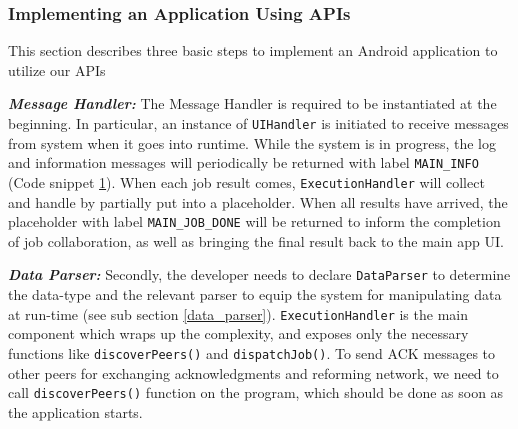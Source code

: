 \documentclass{sig-alternate}[10pt]
\begin{document}
\subsubsection{Implementing an Application Using APIs}
This section describes three basic steps to implement an Android application to utilize our APIs

\textbf{\emph{Message Handler:}}
The Message Handler is required to be instantiated at the beginning. In particular, an instance of \texttt{UIHandler} is initiated to receive messages from system when it goes into runtime. While the system is in progress, the log and information messages will periodically be returned with label \texttt{MAIN\_INFO} (Code snippet \ref{ui_handler}). When each job result comes, \texttt{ExecutionHandler} will collect and handle by partially put into a placeholder. When all results have arrived, the placeholder with label \texttt{MAIN\_JOB\_DONE} will be returned to inform the completion of job collaboration, as well as bringing the final result back to the main app UI.

\begin{figure}
\noindent {}
\label{ui_handler}
\end{figure}

\textbf{\emph{Data Parser:}}
Secondly, the developer needs to declare \texttt{DataParser} to determine the data-type and the relevant parser to equip the system for manipulating data at run-time (see sub section \ref{data_parser}). \texttt{ExecutionHandler} is the main component which wraps up the complexity, and exposes only the necessary functions like \texttt{discoverPeers()} and \texttt{dispatchJob()}. To send ACK messages to other peers for exchanging acknowledgments and reforming network, we need to call \texttt{discoverPeers()} function on the program, which should be done as soon as the application starts.

\begin{figure}
\noindent {}	
  \label{code:get_single_part}

\end{figure}
\end{document}
